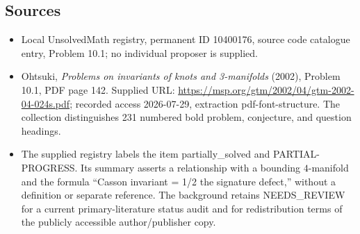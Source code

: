 \documentclass[11pt]{article}
\begin{document}
\subsection{Sources}
\begin{itemize}
\item Local UnsolvedMath registry, permanent ID 10400176, source code catalogue entry, Problem 10.1; no individual proposer is supplied.
\item Ohtsuki, \emph{Problems on invariants of knots and 3-manifolds} (2002), Problem 10.1, PDF page 142. Supplied URL: \url{https://msp.org/gtm/2002/04/gtm-2002-04-024s.pdf}; recorded access 2026-07-29, extraction pdf-font-structure. The collection distinguishes 231 numbered bold problem, conjecture, and question headings.
\item The supplied registry labels the item partially\_solved and PARTIAL-PROGRESS. Its summary asserts a relationship with a bounding \(4\)-manifold and the formula ``Casson invariant = 1/2 the signature defect,'' without a definition or separate reference. The background retains NEEDS\_REVIEW for a current primary-literature status audit and for redistribution terms of the publicly accessible author/publisher copy.
\end{itemize}
\end{document}
